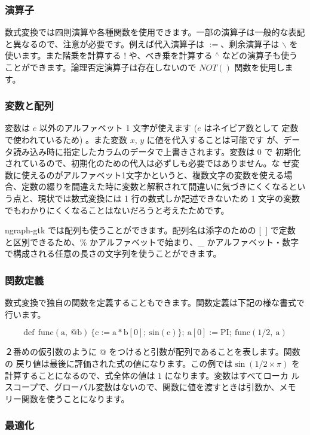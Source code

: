 \documentclass[mingoth,a4paper,twoside]{jsarticle}
\begin{document}
\subsubsection{演算子}

数式変換では四則演算や各種関数を使用できます。一部の演算子は一般的な表記
と異なるので、注意が必要です。例えば代入演算子は $:=$、剰余演算子は
$\backslash$ を使います。また階乗を計算する $!$ や、べき乗を計算する $^\wedge$
などの演算子も使うことができます。論理否定演算子は存在しないので $NOT()$
関数を使用します。

\subsubsection{変数と配列}

変数は $e$ 以外のアルファベット 1 文字が使えます ($e$ はネイピア数として
定数で使われているため) 。また変数 $x$, $y$ に値を代入することは可能です
が、データ読み込み時に指定したカラムのデータで上書きされます。変数は 0 で
初期化されているので、初期化のための代入は必ずしも必要ではありません。な
ぜ変数に使えるのがアルファベット1文字かというと、複数文字の変数を使える場
合、定数の綴りを間違えた時に変数と解釈されて間違いに気づきにくくなるとい
う点と、現状では数式変換には 1 行の数式しか記述できないため 1 文字の変数
でもわかりにくくなることはないだろうと考えたためです。

ngraph-gtk では配列も使うことができます。配列名は添字のための [\ ] で定数
と区別できるため、\% かアルファベットで始まり、\_ かアルファベット・数字
で構成される任意の長さの文字列を使うことができます。

\subsubsection{関数定義}

数式変換で独自の関数を定義することもできます。関数定義は下記の様な書式で
行います。

\[
 \mathrm{def\ \ func(a,\ @b)\ \{c:=a*b[0];\ sin(c)\};\ a[0]:=PI;\ func(1/2,\ a)}
\]

２番めの仮引数のように @ をつけると引数が配列であることを表します。関数の
戻り値は最後に評価された式の値になります。この例では$\sin(1/2\times\pi)$
を計算することになるので、式全体の値は $1$ になります。変数はすべてローカ
ルスコープで、グローバル変数はないので、関数に値を渡すときは引数か、メモ
リー関数を使うことになります。

\subsubsection{最適化}
\end{document}
